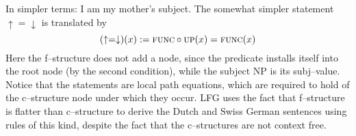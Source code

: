 In simpler terms: I am my mother's subject. The somewhat simpler
statement $\uparrow = \downarrow$ is translated by
\begin{equation}
(\uparrow = \downarrow)(x) :=
\mbox{\sc func} \circ \mbox{\sc up}(x) \doteq \mbox{\sc func}(x)
\end{equation}
Here the f--structure does not add a node, since the predicate
installs itself into the root node (by the second condition),
while the subject NP is its {\sc subj}--value. Notice that the
statements are local path equations, which are required to hold of
the c--structure node under which they occur. LFG uses the fact
that f--structure is flatter than c--structure to derive the Dutch
and Swiss German sentences using rules of this kind, despite the
fact that the c--structures are not context free.

